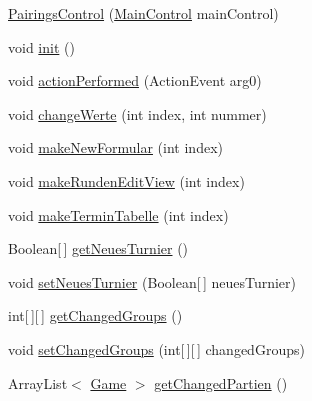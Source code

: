 \begin{DoxyCompactItemize}
\item 
\hyperlink{classde_1_1turnierverwaltung_1_1control_1_1_pairings_control_a3606e6fc4c5fb87c94a72383abd0c1e7}{Pairings\+Control} (\hyperlink{classde_1_1turnierverwaltung_1_1control_1_1_main_control}{Main\+Control} main\+Control)
\item 
void \hyperlink{classde_1_1turnierverwaltung_1_1control_1_1_pairings_control_afda73d26aa794598461516244848ab90}{init} ()
\item 
void \hyperlink{classde_1_1turnierverwaltung_1_1control_1_1_pairings_control_a5daeb6e0ebe20f225f60fbf715f47ada}{action\+Performed} (Action\+Event arg0)
\item 
void \hyperlink{classde_1_1turnierverwaltung_1_1control_1_1_pairings_control_a6f22daa882eb9d4b47709f21dad7c20b}{change\+Werte} (int index, int nummer)
\item 
void \hyperlink{classde_1_1turnierverwaltung_1_1control_1_1_pairings_control_a4c8a8f2fe2a93112a332fac17160f537}{make\+New\+Formular} (int index)
\item 
void \hyperlink{classde_1_1turnierverwaltung_1_1control_1_1_pairings_control_a49a6e580f93d22e2dbfef8831f39a5b0}{make\+Runden\+Edit\+View} (int index)
\item 
void \hyperlink{classde_1_1turnierverwaltung_1_1control_1_1_pairings_control_abd4daa79bf8dcee637b2bc247b0504f0}{make\+Termin\+Tabelle} (int index)
\item 
Boolean\mbox{[}$\,$\mbox{]} \hyperlink{classde_1_1turnierverwaltung_1_1control_1_1_pairings_control_ae08b1f5eaf77f7b12fcb69b4a8ece8a3}{get\+Neues\+Turnier} ()
\item 
void \hyperlink{classde_1_1turnierverwaltung_1_1control_1_1_pairings_control_a3f05016c7bdfaf0fade620ba86ec96eb}{set\+Neues\+Turnier} (Boolean\mbox{[}$\,$\mbox{]} neues\+Turnier)
\item 
int\mbox{[}$\,$\mbox{]}\mbox{[}$\,$\mbox{]} \hyperlink{classde_1_1turnierverwaltung_1_1control_1_1_pairings_control_ad488e831b35a9a2add3c4bea993d9ae4}{get\+Changed\+Groups} ()
\item 
void \hyperlink{classde_1_1turnierverwaltung_1_1control_1_1_pairings_control_a3b07e5adc7c0b5d07fca3540a4e9c6ab}{set\+Changed\+Groups} (int\mbox{[}$\,$\mbox{]}\mbox{[}$\,$\mbox{]} changed\+Groups)
\item 
Array\+List$<$ \hyperlink{classde_1_1turnierverwaltung_1_1model_1_1_game}{Game} $>$ \hyperlink{classde_1_1turnierverwaltung_1_1control_1_1_pairings_control_ac53147fcefa4745ca4d861b4177990a6}{get\+Changed\+Partien} ()

\end{DoxyCompactItemize}
